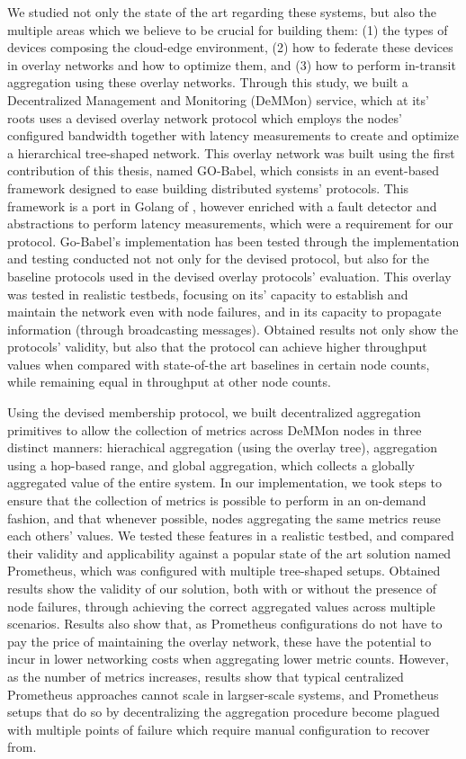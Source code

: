 We studied not only the state of the art regarding these systems, but also the multiple areas which we believe to be crucial for building them: (1) the types of devices composing the cloud-edge environment, (2) how to federate these devices in overlay networks and how to optimize them, and (3) how to perform in-transit aggregation using these overlay networks. Through this study, we built a Decentralized Management and Monitoring (DeMMon) service, which at its’ roots uses a devised overlay network protocol which employs the nodes' configured bandwidth together with latency measurements to create and optimize a hierarchical tree-shaped network. This overlay network was built using the first contribution of this thesis, named GO-Babel, which consists in an event-based framework designed to ease building distributed systems' protocols. This framework is a port in Golang of , however enriched with a fault detector and abstractions to perform latency measurements, which were a requirement for our protocol. Go-Babel's implementation has been tested through the implementation and testing conducted not not only for the devised protocol, but also for the baseline protocols used in the devised overlay protocols' evaluation. This overlay was tested in realistic testbeds, focusing on its’ capacity to establish and maintain the network even with node failures, and in its capacity to propagate information (through broadcasting messages). Obtained results not only show the protocols' validity, but also that the protocol can achieve higher throughput values when compared with state-of-the art baselines in certain node counts, while remaining equal in throughput at other node counts.

Using the devised membership protocol, we built decentralized aggregation primitives to allow the collection of metrics across DeMMon nodes in three distinct manners: hierachical aggregation (using the overlay tree), aggregation using a hop-based range, and global aggregation, which collects a globally aggregated value of the entire system. In our implementation, we took steps to ensure that the collection of metrics is possible to perform in an on-demand fashion, and that whenever possible, nodes aggregating the same metrics reuse each others' values. We tested these features in a realistic testbed, and compared their validity and applicability against a popular state of the art solution named Prometheus, which was configured with multiple tree-shaped setups. Obtained results show the validity of our solution, both with or without the presence of node failures, through achieving the correct aggregated values across multiple scenarios. Results also show that, as Prometheus configurations do not have to pay the price of maintaining the overlay network, these have the potential to incur in lower networking costs when aggregating lower metric counts. However, as the number of metrics increases, results show that typical centralized Prometheus approaches cannot scale in largser-scale systems, and Prometheus setups that do so by decentralizing the aggregation procedure become plagued with multiple points of failure which require manual configuration to recover from. 

